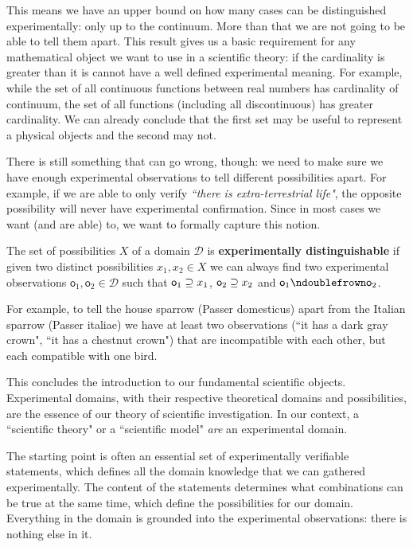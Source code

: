 \documentclass[11pt,letterpaper,fleqn]{memoir} %
\begin{document}
This means we have an upper bound on how many cases can be distinguished experimentally: only up to the continuum. More than that we are not going to be able to tell them apart. This result gives us a basic requirement for any mathematical object we want to use in a scientific theory: if the cardinality is greater than it is cannot have a well defined experimental meaning. For example, while the set of all continuous functions between real numbers has cardinality of continuum, the set of all functions (including all discontinuous) has greater cardinality. We can already conclude that the first set may be useful to represent a physical objects and the second may not.

There is still something that can go wrong, though: we need to make sure we have enough experimental observations to tell different possibilities apart. For example, if we are able to only verify \emph{``there is extra-terrestrial life"}, the opposite possibility will never have experimental confirmation. Since in most cases we want (and are able) to, we want to formally capture this notion.

\begin{mathSection}
\begin{defn}
	The set of possibilities $X$ of a domain $\mathcal{D}$ is \textbf{experimentally distinguishable} if given two distinct possibilities $x_1, x_2 \in X$ we can always find two experimental observations $\textsf{o}_1, \textsf{o}_2 \in \mathcal{D}$ such that $\textsf{o}_1 \supseteq x_1$, $\textsf{o}_2 \supseteq x_2$ and $\textsf{o}_1 \ncomp \textsf{o}_2$.
\end{defn}
\end{mathSection}

For example, to tell the house sparrow (Passer domesticus) apart from the Italian sparrow (Passer italiae) we have at least two observations (``it has a dark gray crown", ``it has a chestnut crown") that are incompatible with each other, but each compatible with one bird.

This concludes the introduction to our fundamental scientific objects. Experimental domains, with their respective theoretical domains and possibilities, are the essence of our theory of scientific investigation. In our context, a ``scientific theory" or a ``scientific model" \emph{are} an experimental domain.


The starting point is often an essential set of experimentally verifiable statements, which defines all the domain knowledge that we can gathered experimentally. The content of the statements determines what combinations can be true at the same time, which define the possibilities for our domain. Everything in the domain is grounded into the experimental observations: there is nothing else in it.
\end{document}
